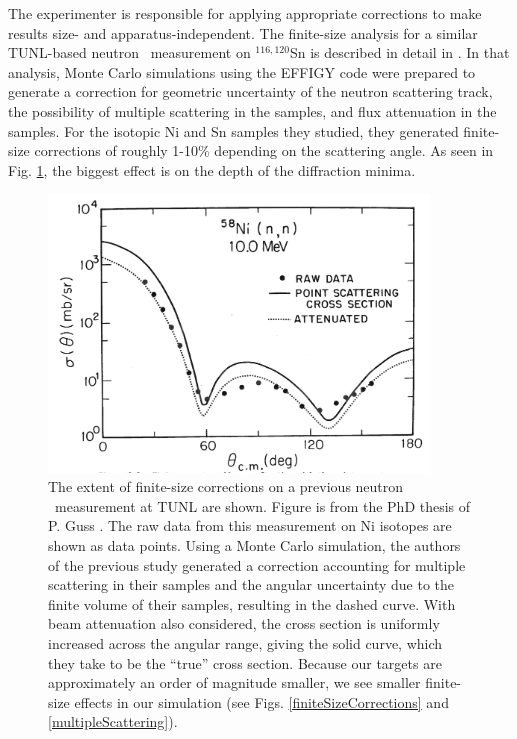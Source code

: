 The experimenter is responsible
for applying appropriate corrections to make results size- and
apparatus-independent. The finite-size analysis for
a similar TUNL-based neutron \el\ measurement on $^{116,120}$Sn is described in detail
in \cite{GussPhDThesis}. In that analysis, Monte Carlo simulations using the
EFFIGY code were
prepared to generate a correction for geometric uncertainty of the neutron
scattering track, the possibility of multiple scattering
in the samples, and flux attenuation in the samples.
For the isotopic Ni and Sn samples they studied, they generated finite-size
corrections of roughly 1-10\% depending on the scattering angle. As seen in
Fig. \ref{GussFiniteSizeEffect}, the
biggest effect is on the depth of the diffraction minima.
\begin{figure}[tb]
    \centering
    \includegraphics[width=0.9\textwidth, trim={0 0.1cm 0 0}, clip]{figures/GussFiniteSizeEffect.png}
    \caption[Effect of finite-size corrections on previous TUNL neutron \el\ measurement]
    {
        The extent of \gls{finite-size corrections} on a previous neutron \el\ measurement at
        TUNL are shown. Figure is from the PhD thesis of P. Guss \cite{GussPhDThesis}.
        The raw data from this measurement on Ni isotopes are shown as data
        points. Using a Monte Carlo simulation, the authors of the previous
        study generated a correction accounting for multiple scattering in
        their samples and the angular uncertainty due to the finite volume
        of their samples, resulting in the dashed curve. With beam
        attenuation also considered, the cross section is uniformly
        increased across the angular range, giving the solid curve, which
        they take to be the ``true'' cross section. Because our targets are
        approximately an order of magnitude smaller, we see smaller
        finite-size effects in our simulation (see Figs.
        \ref{finiteSizeCorrections} and \ref{multipleScattering}).
    }
    \label{GussFiniteSizeEffect}
\end{figure}
